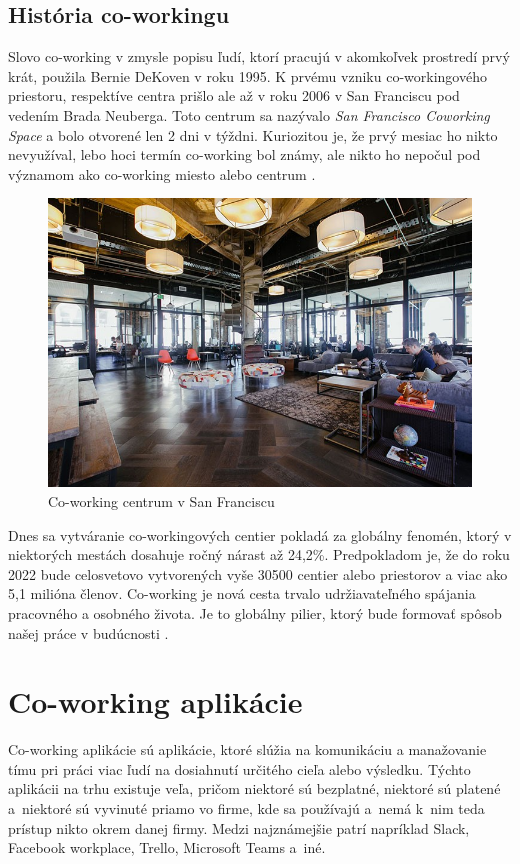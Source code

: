 \subsection{História co-workingu}
\indent Slovo co-working v zmysle popisu ľudí, ktorí pracujú v akomkoľvek prostredí prvý krát, použila Bernie DeKoven v roku 1995. K prvému vzniku co-workingového priestoru, respektíve centra prišlo ale až v roku 2006 v San Franciscu pod vedením Brada Neuberga. Toto centrum sa nazývalo \textit{San Francisco Coworking Space} a bolo otvorené len 2 dni v týždni. Kuriozitou je, že prvý mesiac ho nikto nevyužíval, lebo hoci termín co-working bol známy, ale nikto ho nepočul pod významom ako co-working miesto alebo centrum \cite{co_working_spaces}. 

\begin{figure}[H]
    \centering
    \includegraphics[scale=0.50]{img/coworking_space.jpg}
    \caption{Co-working centrum v San Franciscu \cite{co_working_spaces}}
    \label{fig:img-co-space}
\end{figure}

\indent Dnes sa vytváranie co-workingových centier pokladá za globálny fenomén, ktorý v niektorých mestách dosahuje ročný nárast až 24,2\%. Predpokladom je, že do roku 2022 bude celosvetovo vytvorených vyše 30500 centier alebo priestorov a viac ako 5,1 milióna členov. Co-working je nová cesta trvalo udržiavateľného spájania pracovného a osobného života. Je to globálny pilier, ktorý bude formovať spôsob našej práce v budúcnosti \cite{co_working_spaces}. 

\section{Co-working aplikácie}
\indent Co-working aplikácie sú aplikácie, ktoré slúžia na komunikáciu a manažovanie tímu pri práci viac ľudí na dosiahnutí určitého cieľa alebo výsledku. Týchto aplikácii na trhu existuje veľa, pričom niektoré sú bezplatné, niektoré sú platené a niektoré sú vyvinuté priamo vo firme, kde sa používajú a nemá k nim teda prístup nikto okrem danej firmy. Medzi najznámejšie patrí napríklad Slack, Facebook workplace, Trello, Microsoft Teams a iné.
 
